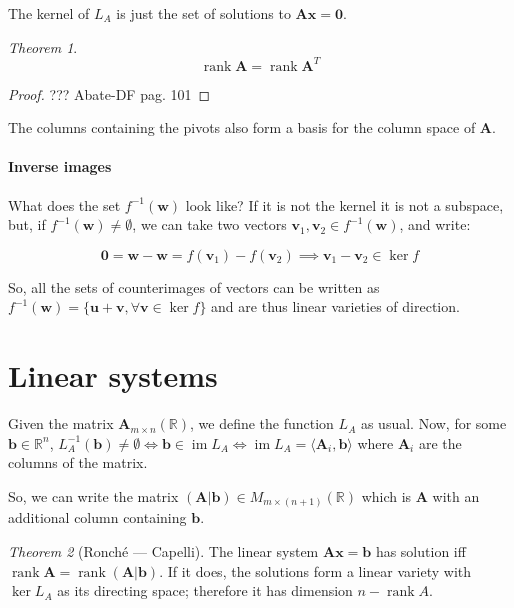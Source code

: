 \documentclass[12pt,a4paper]{report}
\numberwithin{equation}{section}
\theoremstyle{definition}
\theoremstyle{remark}
\newtheorem{theorem}{Theorem}[section]
\DeclareMathOperator{\rank}{rank}
\DeclareMathOperator{\im}{im}
\begin{document}
The kernel of $L_A$ is just the set of solutions to $\mathbf{Ax} = \mathbf{0}$.

\begin{theorem}
\begin{equation}
\rank \mathbf{A} = \rank \mathbf{A}^T
\end{equation}
\end{theorem}

\begin{proof}

??? Abate-DF pag. 101
\end{proof}

The columns containing the pivots also form a basis for the column space of $\mathbf{A}$.

\paragraph{Inverse images}

What does the set $f^{-1} (\mathbf{w})$ look like? If it is not the kernel it is not a subspace, but, if $f^{-1} (\mathbf{w}) \neq \emptyset$, we can take two vectors $\mathbf{v}_1, \mathbf{v}_2 \in f^{-1} (\mathbf{w})$, and write:

\begin{equation}
\mathbf{0} = \mathbf{w} - \mathbf{w} = f(\mathbf{v}_1) - f(\mathbf{v}_2) \implies \mathbf{v}_1 - \mathbf{v}_2 \in \ker f
\end{equation}

So, all the sets of counterimages of vectors can be written as $f^{-1} (\mathbf{w}) = \lbrace \mathbf{u} + \mathbf{v}, \forall \mathbf{v} \in\ker f \rbrace$ and are thus linear varieties of direction.

\section{Linear systems}

Given the matrix $\mathbf{A}_{m\times n} (\mathbb{R})$, we define the function $L_A$ as usual. Now, for some $\mathbf{b} \in \mathbb{R}^n$, $L_A^{-1} (\mathbf{b}) \neq \emptyset \iff \mathbf{b} \in \im L_A \iff \im L_A = \langle \mathbf{A}_i, \mathbf{b}\rangle$ where $\mathbf{A}_i$ are the columns of the matrix.

So, we can write the matrix $(\mathbf{A}|\mathbf{b}) \in M_{m\times(n+1)} (\mathbb{R})$ which is $\mathbf{A}$ with an additional column containing $\mathbf{b}$.

\begin{theorem}[Ronché --- Capelli]
The linear system $\mathbf{Ax} = \mathbf{b}$ has solution iff $\rank \mathbf{A} = \rank (\mathbf{A}|\mathbf{b})$. If it does, the solutions form a linear variety with $\ker L_A$ as its directing space; therefore it has dimension $n - \rank A$.
\end{theorem}

\tableofcontents
\end{document}
